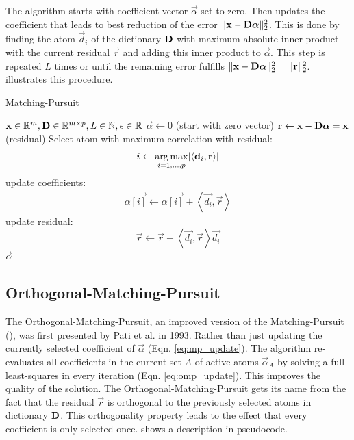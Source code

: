 The algorithm starts with coefficient vector $\vec{\alpha}$ set
to zero. Then updates the coefficient that leads to best reduction of the
error $\lVert \boldsymbol{\mathrm{x}} - \boldsymbol{\mathrm{D}}\boldsymbol{\mathrm{\alpha}} \rVert^{2}_{2}$. This is done by
finding the atom $\vec{d}_i$ of the dictionary $\boldsymbol{\mathrm{D}}$ with maximum absolute
inner product with the current residual $\vec{r}$ and adding this inner product
to $\vec{\alpha}$. This step is repeated $L$ times or until the remaining error
fulfills $\lVert \boldsymbol{\mathrm{x}} -
\boldsymbol{\mathrm{D}}\boldsymbol{\mathrm{\alpha}}
\rVert^{2}_{2} = \lVert \boldsymbol{\mathrm{r}} \rVert_2^2$.
 illustrates this procedure.
\begin{algorithm}[h]
\caption{Matching-Pursuit}
\label{alg:mp}
\begin{algorithmic}[1]
\REQUIRE $\boldsymbol{\mathrm{x}} \in \mathbb{R}^m, \boldsymbol{\mathrm{D}} \in \mathbb{R}^{m\times p}, L \in
\mathbb{N}, \epsilon \in \mathbb{R}$
\STATE $\vec{\alpha} \gets 0$ (start with zero vector)
\STATE $\boldsymbol{\mathrm{r}} \gets \boldsymbol{\mathrm{x}}-\boldsymbol{\mathrm{D}}\boldsymbol{\mathrm{\alpha}} = \boldsymbol{\mathrm{x}}$ (residual) 
\STATE Select atom with maximum correlation with residual: 
\begin{equation*}
i \gets \operatorname*{arg\,max}_{i=1,...,p} \lvert \left<\boldsymbol{\mathrm{d}}_i,\boldsymbol{\mathrm{r}}\right> \rvert
\end{equation*}
\STATE update coefficients: 
\begin{align}
\vec{\alpha[i]}  \gets \vec{\alpha[i]} + \left<\vec{d_i},\vec{r}\right>
\label{eq:mp_update}
\end{align}
\STATE update residual:
\begin{equation*}
 \vec{r} \gets \vec{r} - \left<\vec{d_i},\vec{r}\right>\vec{d_i}
\end{equation*}
\ENDWHILE
\RETURN $\vec{\alpha}$
\end{algorithmic}
\end{algorithm}

\subsection{Orthogonal-Matching-Pursuit}
\label{sec:omp}
The Orthogonal-Matching-Pursuit, an improved version of
the Matching-Pursuit (), was first presented by Pati et al.
in 1993\cite{Pati1993}. Rather than just updating the currently selected
coefficient of $\vec{\alpha}$ (Eqn. \ref{eq:mp_update}). The algorithm
re-evaluates 
all coefficients in the current set $A$ of active atoms $\vec{\alpha}_A$ by
solving a full least-squares in every iteration (Eqn. \ref{eq:omp_update}).
This improves the quality of the solution\cite{Pati1993}. The
Orthogonal-Matching-Pursuit gets its name from the fact that the residual
$\vec{r}$ is orthogonal to the previously selected atoms in dictionary
$\boldsymbol{\mathrm{D}}$. This orthogonality property leads to the effect that every
coefficient is only selected once.  shows a
description in pseudocode.

